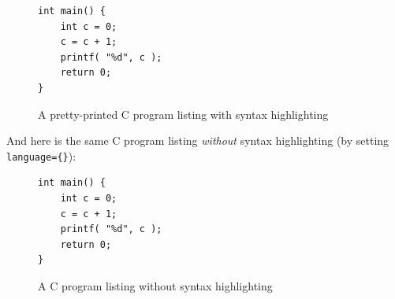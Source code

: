 \begin{figure}[hbt!]
\lstset{basicstyle=\sffamily, language=C, breaklines=true, columns=fullflexible, framesep=10pt, xleftmargin=.4\textwidth, tabsize=4}
\begin{lstlisting}
int main() {
	int c = 0;
	c = c + 1;
	printf( "%d", c );
	return 0;
}
\end{lstlisting}
\caption{A pretty-printed C program listing with syntax highlighting}
\end{figure}


And here is the same C program listing \emph{without} syntax highlighting (by setting \verb|language={}|):

\begin{figure}[hbt!]

\begin{lstlisting}
int main() {
	int c = 0;
	c = c + 1;
	printf( "%d", c );
	return 0;
}
\end{lstlisting}
\caption{A C program listing without syntax highlighting}
\end{figure}
